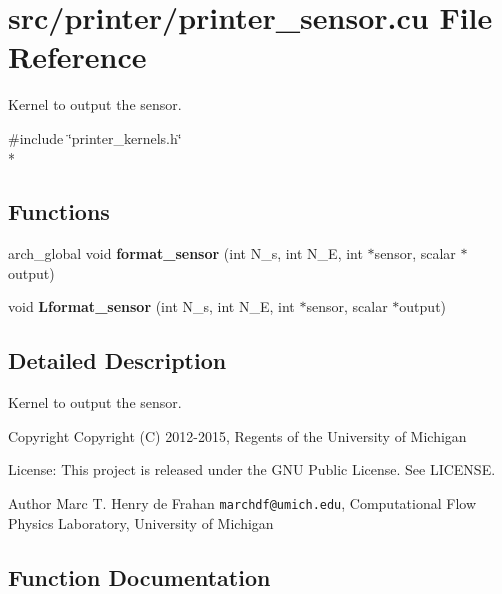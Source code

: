 \section{src/printer/printer\-\_\-sensor.cu File Reference}
\label{printer__sensor_8cu}


Kernel to output the sensor.  


{\ttfamily \#include \char`\"{}printer\-\_\-kernels.\-h\char`\"{}}\\*
\subsection*{Functions}
\begin{DoxyCompactItemize}
\item 
arch\-\_\-global void {\bf format\-\_\-sensor} (int N\-\_\-s, int N\-\_\-\-E, int $\ast$sensor, scalar $\ast$output)
\item 
void {\bf Lformat\-\_\-sensor} (int N\-\_\-s, int N\-\_\-\-E, int $\ast$sensor, scalar $\ast$output)
\end{DoxyCompactItemize}


\subsection{Detailed Description}
Kernel to output the sensor. \begin{DoxyCopyright}{Copyright}
Copyright (C) 2012-\/2015, Regents of the University of Michigan 
\end{DoxyCopyright}
\begin{DoxyParagraph}{License\-:}
This project is released under the G\-N\-U Public License. See L\-I\-C\-E\-N\-S\-E. 
\end{DoxyParagraph}
\begin{DoxyAuthor}{Author}
Marc T. Henry de Frahan {\tt marchdf@umich.\-edu}, Computational Flow Physics Laboratory, University of Michigan 
\end{DoxyAuthor}


\subsection{Function Documentation}
